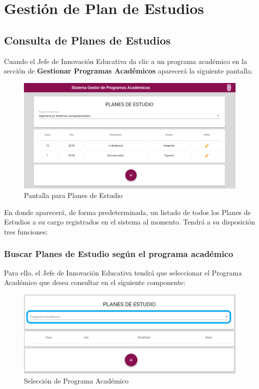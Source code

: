 
\section{Gestión de Plan de Estudios}
\subsection{Consulta de Planes de Estudios}
Cuando el Jefe de Innovación Educativa da clic a un programa académico en la sección de \textbf{Gestionar Programas Académicos} aparecerá la siguiente pantalla:


\begin{figure}[!hbtp]
	\centering
	\hypertarget{consultarPE}{\includegraphics[width=0.7\linewidth]{images/SP4-GPE/consultar}}
	\caption{Pantalla para Planes de Estudio}
	\label{consultarPE}
\end{figure}

En donde aparecerá, de forma predeterminada, un listado de todos los Planes de Estudios a su cargo registrados en el sistema al momento. Tendrá a su disposición tres funciones:

\subsubsection{Buscar Planes de Estudio según el programa académico}

Para ello, el Jefe de Innovación Educativa tendrá que seleccionar el Programa Académico que desea consultar en el siguiente componente:

\begin{figure}[!hbtp]
	\centering
	\hypertarget{academico}{\includegraphics[width=0.7\linewidth]{images/SP4-GPE/programa}}
	\caption{Selección de Programa Académico}
	\label{academico}
\end{figure}

